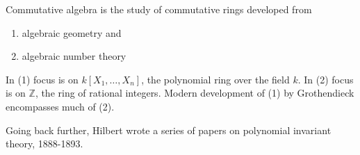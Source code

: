 Commutative algebra is the study of commutative rings developed from
\begin{enumerate}[label=(\arabic*)]
	\item algebraic geometry and
	\item algebraic number theory
\end{enumerate}

In (1) focus is on $k[X_1, \ldots, X_n]$, the polynomial ring over the field
$k$. In (2) focus is on $\mathbb{Z}$, the ring of rational integers. Modern
development of (1) by Grothendieck encompasses much of (2).

Going back further, Hilbert wrote a series of papers on polynomial invariant
theory, 1888-1893.
